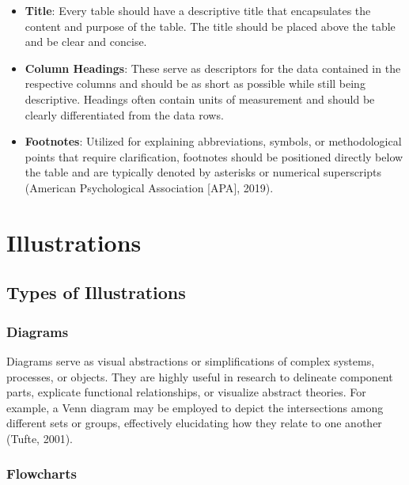 \documentclass[
  b5paper]{book}
\begin{document}
\begin{itemize}
\item
  \textbf{Title}: Every table should have a descriptive title that encapsulates the content and purpose of the table. The title should be placed above the table and be clear and concise.
\item
  \textbf{Column Headings}: These serve as descriptors for the data contained in the respective columns and should be as short as possible while still being descriptive. Headings often contain units of measurement and should be clearly differentiated from the data rows.
\item
  \textbf{Footnotes}: Utilized for explaining abbreviations, symbols, or methodological points that require clarification, footnotes should be positioned directly below the table and are typically denoted by asterisks or numerical superscripts (American Psychological Association {[}APA{]}, 2019).
\end{itemize}

\hypertarget{illustrations}{%
\section{Illustrations}\label{illustrations}}

\hypertarget{types-of-illustrations}{%
\subsection{Types of Illustrations}\label{types-of-illustrations}}

\hypertarget{diagrams}{%
\subsubsection{Diagrams}\label{diagrams}}

Diagrams serve as visual abstractions or simplifications of complex systems, processes, or objects. They are highly useful in research to delineate component parts, explicate functional relationships, or visualize abstract theories. For example, a Venn diagram may be employed to depict the intersections among different sets or groups, effectively elucidating how they relate to one another (Tufte, 2001).

\hypertarget{flowcharts}{%
\subsubsection{Flowcharts}\label{flowcharts}}
\end{document}
